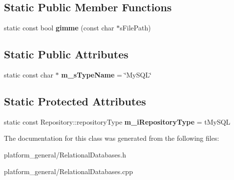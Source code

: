 \subsection*{\-Static \-Public \-Member \-Functions}
\begin{DoxyCompactItemize}
\item 
\hypertarget{classgeneral__server_1_1MySQL_a7758a8150eb1121d79245ca0b5aa1e26}{static const bool {\bfseries gimme} (const char $\ast$s\-File\-Path)}\label{classgeneral__server_1_1MySQL_a7758a8150eb1121d79245ca0b5aa1e26}

\end{DoxyCompactItemize}
\subsection*{\-Static \-Public \-Attributes}
\begin{DoxyCompactItemize}
\item 
\hypertarget{classgeneral__server_1_1MySQL_a17b9f1bd70f511b8d0ab7edd7b6ab200}{static const char $\ast$ {\bfseries m\-\_\-s\-Type\-Name} = \char`\"{}\-My\-S\-Q\-L\char`\"{}}\label{classgeneral__server_1_1MySQL_a17b9f1bd70f511b8d0ab7edd7b6ab200}

\end{DoxyCompactItemize}
\subsection*{\-Static \-Protected \-Attributes}
\begin{DoxyCompactItemize}
\item 
\hypertarget{classgeneral__server_1_1MySQL_a67b5700e12b33189eec58d57db232157}{static const \*
\-Repository\-::repository\-Type {\bfseries m\-\_\-i\-Repository\-Type} = t\-My\-S\-Q\-L}\label{classgeneral__server_1_1MySQL_a67b5700e12b33189eec58d57db232157}

\end{DoxyCompactItemize}


\-The documentation for this class was generated from the following files\-:\begin{DoxyCompactItemize}
\item 
platform\-\_\-general/\-Relational\-Databases.\-h\item 
platform\-\_\-general/\-Relational\-Databases.\-cpp\end{DoxyCompactItemize}
